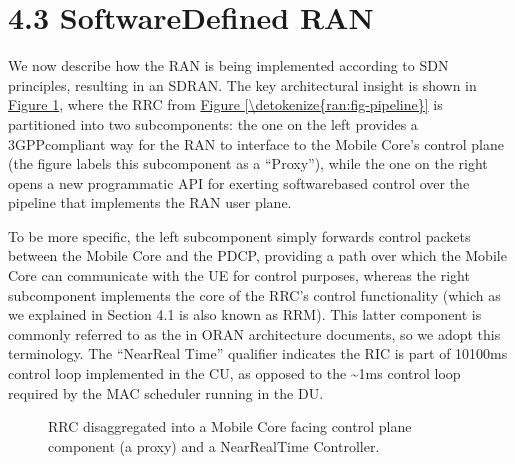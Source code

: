 \documentclass[a4paper,11pt,english]{sphinxmanual}
\let\sphinxpxdimen\pdfpxdimen\else\newdimen\sphinxpxdimen
\begin{document}
\section{4.3 Software\sphinxhyphen{}Defined RAN}
\label{\detokenize{ran:software-defined-ran}}
\sphinxAtStartPar
We now describe how the RAN is being implemented according to SDN
principles, resulting in an SD\sphinxhyphen{}RAN. The key architectural insight is
shown in \hyperref[\detokenize{ran:fig-rrc-split}]{Figure \ref{\detokenize{ran:fig-rrc-split}}}, where the RRC from
\hyperref[\detokenize{ran:fig-pipeline}]{Figure \ref{\detokenize{ran:fig-pipeline}}} is partitioned into two
sub\sphinxhyphen{}components: the one on the left provides a 3GPP\sphinxhyphen{}compliant way for
the RAN to interface to the Mobile Core’s control plane (the figure
labels this sub\sphinxhyphen{}component as a “Proxy”), while the one on the right
opens a new programmatic API for exerting software\sphinxhyphen{}based control over
the pipeline that implements the RAN user plane.

\sphinxAtStartPar
To be more specific, the left sub\sphinxhyphen{}component simply forwards control
packets between the Mobile Core and the PDCP, providing a path over
which the Mobile Core can communicate with the UE for control
purposes, whereas the right sub\sphinxhyphen{}component implements the core of the
RRC’s control functionality (which as we explained in Section 4.1 is
also known as RRM). This latter component is commonly referred to as
the  in O\sphinxhyphen{}RAN architecture
documents, so we adopt this terminology. The “Near\sphinxhyphen{}Real Time”
qualifier indicates the RIC is part of 10\sphinxhyphen{}100ms control loop
implemented in the CU, as opposed to the \textasciitilde{}1ms control loop required by
the MAC scheduler running in the DU.

\begin{figure}[ht]
\centering
\capstart

\noindent\sphinxincludegraphics[width=600\sphinxpxdimen]{{Slide42}.png}
\caption{RRC disaggregated into a Mobile Core facing control plane
component (a proxy) and a Near\sphinxhyphen{}Real\sphinxhyphen{}Time Controller.}\label{\detokenize{ran:id9}}\label{\detokenize{ran:fig-rrc-split}}\end{figure}
\end{document}
